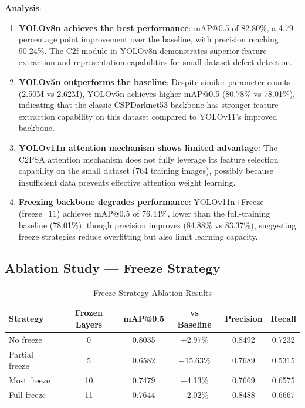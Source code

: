 \documentclass[12pt,a4paper]{article}
\begin{document}
\textbf{Analysis}:

\begin{enumerate}[noitemsep]
  \item \textbf{YOLOv8n achieves the best performance}: mAP@0.5 of 82.80\%, a 4.79 percentage point improvement over the baseline, with precision reaching 90.24\%. The C2f module in YOLOv8n demonstrates superior feature extraction and representation capabilities for small dataset defect detection.

  \item \textbf{YOLOv5n outperforms the baseline}: Despite similar parameter counts (2.50M vs 2.62M), YOLOv5n achieves higher mAP@0.5 (80.78\% vs 78.01\%), indicating that the classic CSPDarknet53 backbone has stronger feature extraction capability on this dataset compared to YOLOv11's improved backbone.

  \item \textbf{YOLOv11n attention mechanism shows limited advantage}: The C2PSA attention mechanism does not fully leverage its feature selection capability on the small dataset (764 training images), possibly because insufficient data prevents effective attention weight learning.

  \item \textbf{Freezing backbone degrades performance}: YOLOv11n+Freeze (freeze=11) achieves mAP@0.5 of 76.44\%, lower than the full-training baseline (78.01\%), though precision improves (84.88\% vs 83.37\%), suggesting freeze strategies reduce overfitting but also limit learning capacity.
\end{enumerate}

\subsection{Ablation Study --- Freeze Strategy}

\begin{table}[H]
\centering
\caption{Freeze Strategy Ablation Results}
\label{tab:ablation}
\begin{tabular}{lccccc}
\toprule
Strategy & Frozen Layers & mAP@0.5 & vs Baseline & Precision & Recall \\
\midrule
No freeze & 0 & 0.8035 & +2.97\% & 0.8492 & 0.7232 \\
Partial freeze & 5 & 0.6582 & $-$15.63\% & 0.7689 & 0.5315 \\
Most freeze & 10 & 0.7479 & $-$4.13\% & 0.7669 & 0.6575 \\
Full freeze & 11 & 0.7644 & $-$2.02\% & 0.8488 & 0.6667 \\
\bottomrule
\end{tabular}
\end{table}
\end{document}
